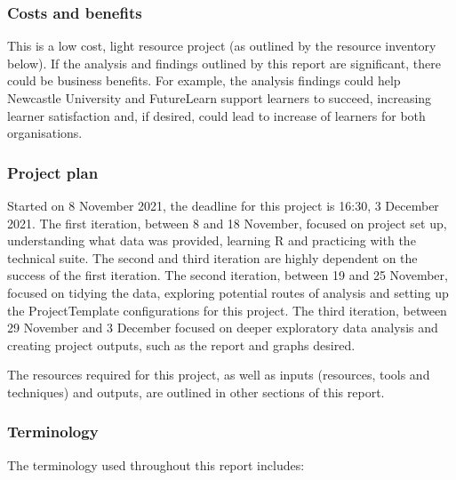 \documentclass[
]{article}
\begin{document}
\hypertarget{costs-and-benefits}{%
\subsubsection{Costs and benefits}\label{costs-and-benefits}}

This is a low cost, light resource project (as outlined by the resource
inventory below). If the analysis and findings outlined by this report
are significant, there could be business benefits. For example, the
analysis findings could help Newcastle University and FutureLearn
support learners to succeed, increasing learner satisfaction and, if
desired, could lead to increase of learners for both organisations.

\hypertarget{project-plan}{%
\subsubsection{Project plan}\label{project-plan}}

Started on 8 November 2021, the deadline for this project is 16:30, 3
December 2021. The first iteration, between 8 and 18 November, focused
on project set up, understanding what data was provided, learning R and
practicing with the technical suite. The second and third iteration are
highly dependent on the success of the first iteration. The second
iteration, between 19 and 25 November, focused on tidying the data,
exploring potential routes of analysis and setting up the
ProjectTemplate configurations for this project. The third iteration,
between 29 November and 3 December focused on deeper exploratory data
analysis and creating project outputs, such as the report and graphs
desired.

The resources required for this project, as well as inputs (resources,
tools and techniques) and outputs, are outlined in other sections of
this report.

\hypertarget{terminology}{%
\subsubsection{Terminology}\label{terminology}}

The terminology used throughout this report includes:
\end{document}
